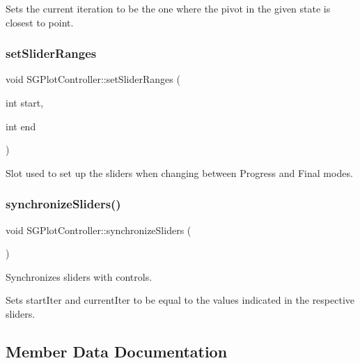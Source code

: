 Sets the current iteration to be the one where the pivot in the given state is closest to point. \mbox{\label{classSGPlotController_a30efaeb2ec5cb752d6354f05447b287a}} 
\subsubsection{\texorpdfstring{set\+Slider\+Ranges}{setSliderRanges}}
{\footnotesize\ttfamily void S\+G\+Plot\+Controller\+::set\+Slider\+Ranges (\begin{DoxyParamCaption}\item[{int}]{start,  }\item[{int}]{end }\end{DoxyParamCaption})\hspace{0.3cm}{\ttfamily [slot]}}

Slot used to set up the sliders when changing between Progress and Final modes. \mbox{\label{classSGPlotController_a2d4971bb9f2f6116ce314d146a43bb08}} 
\subsubsection{\texorpdfstring{synchronize\+Sliders()}{synchronizeSliders()}}
{\footnotesize\ttfamily void S\+G\+Plot\+Controller\+::synchronize\+Sliders (\begin{DoxyParamCaption}{ }\end{DoxyParamCaption})}



Synchronizes sliders with controls. 

Sets start\+Iter and current\+Iter to be equal to the values indicated in the respective sliders. 

\subsection{Member Data Documentation}
\mbox{\label{classSGPlotController_a0baff45708bb3bf9fd976975cd0d6ac4}} 
